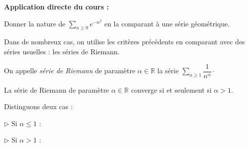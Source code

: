 \documentclass[french,11pt,twoside]{VcCours}
\newenvironment{ApplicationDirecte}{\textbf{Application directe du cours :}

}{}
\newcommand{\dx}{\text{d}x}
\newcommand{\Sum}[2]{\ensuremath{\textstyle{\sum\limits_{#1}^{#2}}}}
\begin{document}
\begin{ApplicationDirecte} Donner la nature de $ \Sum{n \geq 0}{}  e^{-n^2}$ en la comparant à une série géométrique.
\end{ApplicationDirecte}

Dans de nombreux cas, on utilise les critères précédents en comparant avec des séries usuelles : les séries de Riemann.


\begin{Definition}{}
On appelle \emph{série de Riemann} de paramètre $\alpha \in \mathbb{R}$ la série $\Sum{n \geq 1}{} \dfrac{1}{n^{\alpha}} \cdot$
\end{Definition}

\begin{Theoreme}{}
La série de Riemann de paramètre $\alpha \in \mathbb{R}$ converge si et seulement si $\alpha >1$.
\end{Theoreme}

\begin{Demonstration}{} Distinguons deux cas :

$\rhd$ Si $\alpha \leq 1$ :

%

\vspace{3cm}

\newpage
$\rhd$ Si $\alpha>1$ :
%

\vspace*{8cm}

$\phantom{test}$ 

\vspace*{7cm}
\end{Demonstration}
\end{document}
